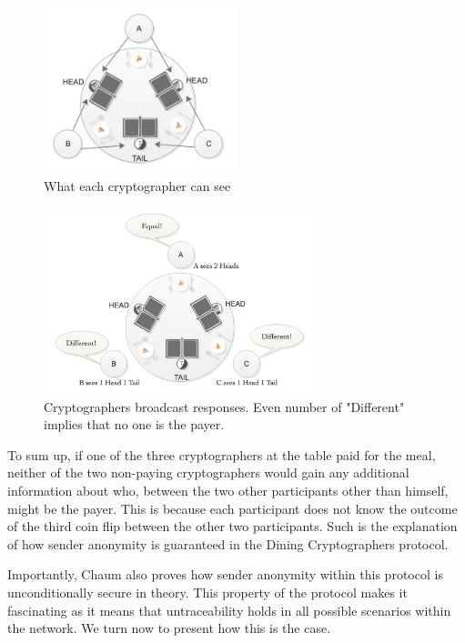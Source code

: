 \begin{figure}[h!]
    \centering
    \includegraphics[width=0.50\textwidth]{Images/DCstep2.png}
    \caption{What each cryptographer can see}
    \label{fig:dcstage2}
\end{figure}

\begin{figure}[h!]
    \centering
    \includegraphics[width=0.70\textwidth]{Images/DCstep3NoPayers.png}
    \caption{Cryptographers broadcast responses. Even number of "Different" implies that no one is the payer.}
    \label{fig:dcstage3}
\end{figure}

To sum up, if one of the three cryptographers at the table paid for the meal, neither of the two non-paying cryptographers would gain any additional information about who, between the two other participants other than himself, might be the payer. This is because each participant does not know the outcome of the third coin flip between the other two participants.  Such is the explanation of how sender anonymity is guaranteed in the Dining Cryptographers protocol. 

Importantly, Chaum also proves how sender anonymity within this protocol is unconditionally secure in theory. This property of the protocol makes it fascinating as it means that untraceability holds in all possible scenarios within the network.  We turn now to present how this is the case. 


